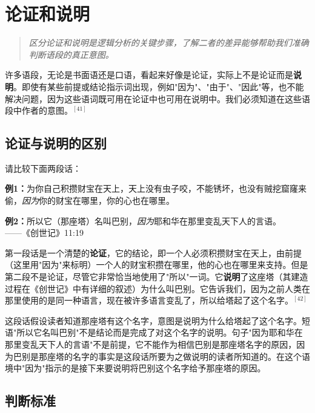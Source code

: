 \section{论证和说明}

\begin{quotation}
\textit{区分论证和说明是逻辑分析的关键步骤，了解二者的差异能够帮助我们准确判断语段的真正意图。}
\end{quotation}

许多语段，无论是书面语还是口语，看起来好像是论证，实际上不是论证而是\textbf{说明}。即使有某些前提或结论指示词出现，例如"因为"、"由于"、"因此"等，也不能解决问题，因为这些语词既可用在论证中也可用在说明中。我们必须知道在这些语段中作者的意图。$^{[41]}$

\subsection{论证与说明的区别}

请比较下面两段话：

\begin{displayquote}
\textbf{例1：}为你自己积攒财宝在天上，天上没有虫子咬，不能锈坏，也没有贼挖窟窿来偷，\textit{因为}你的财宝在哪里，你的心也在哪里。
\end{displayquote}

\begin{displayquote}
\textbf{例2：}所以它（那座塔）名叫巴别，\textit{因为}耶和华在那里变乱天下人的言语。\\
——《创世记》11:19
\end{displayquote}

第一段话是一个清楚的\textbf{论证}，它的结论，即一个人必须积攒财宝在天上，由前提（这里用"因为"来标明）一个人的财宝积攒在哪里，他的心也在哪里来支持。但是第二段不是论证，尽管它非常恰当地使用了"所以"一词。它\textbf{说明}了这座塔（其建造过程在《创世记》中有详细的叙述）为什么叫巴别。它告诉我们，因为之前人类在那里使用的是同一种语言，现在被许多语言变乱了，所以给塔起了这个名字。$^{[42]}$

这段话假设读者知道那座塔有这个名字，意图是说明为什么给塔起了这个名字。短语"所以它名叫巴别"不是结论而是完成了对这个名字的说明。句子"因为耶和华在那里变乱天下人的言语"不是前提，它不能作为相信巴别是那座塔名字的原因，因为巴别是那座塔的名字的事实是这段话所要为之做说明的读者所知道的。在这个语境中"因为"指示的是接下来要说明将巴别这个名字给予那座塔的原因。

\subsection{判断标准}

